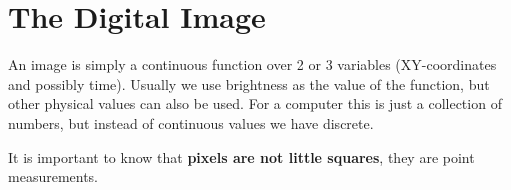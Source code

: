 \section{The Digital Image}

An image is simply a continuous function over 2 or 3 variables (XY-coordinates and possibly time). Usually we use brightness as the value of the function, but other physical values can also be used. For a computer this is just a collection of numbers, but instead of continuous values we have discrete. 

It is important to know that \textbf{pixels are not little squares}, they are point measurements.